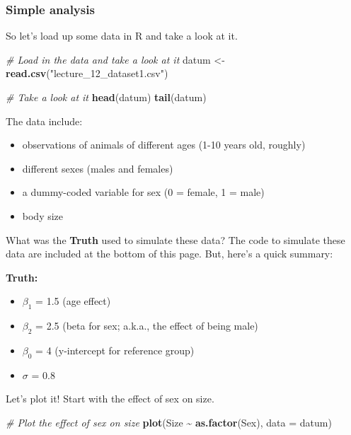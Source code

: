 \documentclass[
]{article}
\newenvironment{Shaded}{\begin{snugshade}}{\end{snugshade}}
\newcommand{\AttributeTok}[1]{\textcolor[rgb]{0.13,0.29,0.53}{#1}}
\newcommand{\CommentTok}[1]{\textcolor[rgb]{0.56,0.35,0.01}{\textit{#1}}}
\newcommand{\FunctionTok}[1]{\textcolor[rgb]{0.13,0.29,0.53}{\textbf{#1}}}
\newcommand{\NormalTok}[1]{#1}
\newcommand{\OtherTok}[1]{\textcolor[rgb]{0.56,0.35,0.01}{#1}}
\newcommand{\SpecialCharTok}[1]{\textcolor[rgb]{0.81,0.36,0.00}{\textbf{#1}}}
\newcommand{\StringTok}[1]{\textcolor[rgb]{0.31,0.60,0.02}{#1}}
\providecommand{\tightlist}{%
  \setlength{\itemsep}{0pt}\setlength{\parskip}{0pt}}
\begin{document}
\subsubsection{Simple analysis}\label{simple-analysis}

So let's load up some data in R and take a look at it.

\begin{Shaded}
\begin{Highlighting}[]
\CommentTok{\# Load in the data and take a look at it}
\NormalTok{datum }\OtherTok{\textless{}{-}} \FunctionTok{read.csv}\NormalTok{(}\StringTok{"lecture\_12\_dataset1.csv"}\NormalTok{)}

\CommentTok{\# Take a look at it}
\FunctionTok{head}\NormalTok{(datum)}
\FunctionTok{tail}\NormalTok{(datum)}
\end{Highlighting}
\end{Shaded}

The data include:

\begin{itemize}
\tightlist
\item
  observations of animals of different ages (1-10 years old, roughly)
\item
  different sexes (males and females)
\item
  a dummy-coded variable for sex (0 = female, 1 = male)
\item
  body size
\end{itemize}

What was the \textbf{Truth} used to simulate these data? The code to
simulate these data are included at the bottom of this page. But, here's
a quick summary:

\textbf{Truth:}

\begin{itemize}
\tightlist
\item
  \(\beta_1\) = 1.5 (age effect)
\item
  \(\beta_2\) = 2.5 (beta for sex; a.k.a., the effect of being male)
\item
  \(\beta_0\) = 4 (y-intercept for reference group)
\item
  \(\sigma\) = 0.8
\end{itemize}

Let's plot it! Start with the effect of sex on size.

\begin{Shaded}
\begin{Highlighting}[]
\CommentTok{\# Plot the effect of sex on size}
\FunctionTok{plot}\NormalTok{(Size }\SpecialCharTok{\textasciitilde{}} \FunctionTok{as.factor}\NormalTok{(Sex), }\AttributeTok{data =}\NormalTok{ datum)}
\end{Highlighting}
\end{Shaded}
\end{document}

